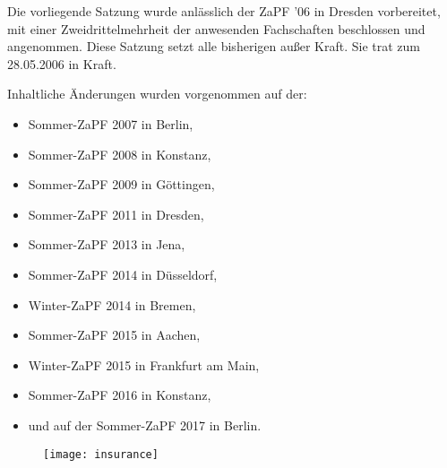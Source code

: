 Die vorliegende Satzung wurde anlässlich der ZaPF '06 in Dresden vorbereitet,
mit einer Zweidrittelmehrheit der anwesenden Fachschaften beschlossen und
angenommen. Diese Satzung setzt alle bisherigen außer Kraft. Sie trat zum
28.05.2006 in Kraft.

Inhaltliche Änderungen wurden vorgenommen auf der:
%
\begin{itemize}

\item Sommer-ZaPF 2007 in Berlin,

\item Sommer-ZaPF 2008 in Konstanz,

\item Sommer-ZaPF 2009 in Göttingen,

\item Sommer-ZaPF 2011 in Dresden,

\item Sommer-ZaPF 2013 in Jena,

\item Sommer-ZaPF 2014 in Düsseldorf,

\item Winter-ZaPF 2014 in Bremen,

\item Sommer-ZaPF 2015 in Aachen,

\item Winter-ZaPF 2015 in Frankfurt am Main,

\item Sommer-ZaPF 2016 in Konstanz,

\item und auf der Sommer-ZaPF 2017 in Berlin.

\end{itemize}

\begin{figure}[b]
\texttt{[image: insurance]}
\end{figure}